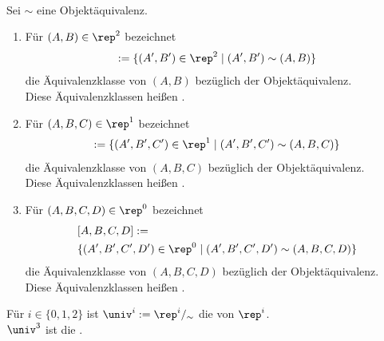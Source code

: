         \begin{dfn}\ \vspace{8pt}

            \noindent
            Sei $\sim$ eine Objektäquivalenz.
            \begin{enumerate}
                \item Für $(A,B) \in \rep^2$ bezeichnet 
                    \begin{align*}
                        [A,B] := \{(A',B') \in \rep^2 \mid (A',B') \sim (A,B)\}
                    \end{align*}
                    die Äquivalenzklasse von $(A,B)$ bezüglich der Objektäquivalenz.\\
                    Diese Äquivalenzklassen heißen .
                    
                \item Für $(A,B,C) \in \rep^1$ bezeichnet
                    \begin{align*}
                        [A,B,C] := \{(A',B',C') \in \rep^1 \mid (A',B',C') \sim (A,B,C)\}
                    \end{align*}			 
                    die Äquivalenzklasse von $(A,B,C)$ bezüglich der Objektäquivalenz.\\
                    Diese Äquivalenzklassen heißen .
                \item Für $(A,B,C,D) \in \rep^0$ bezeichnet
                    \begin{align*}
                        &[A,B,C,D] := \\
                        &\{(A',B',C',D') \in \rep^0 \mid (A',B',C',D') \sim (A,B,C,D)\}
                    \end{align*}			 
                    die Äquivalenzklasse von $(A,B,C,D)$ bezüglich der Objektäquivalenz.\\
                    Diese Äquivalenzklassen heißen .
            \end{enumerate}
            \noindent	
                Für $i \in \{0,1,2\}$ ist $\univ^i := \rep^i /_\sim$ die  von $\rep^i$.\\
                $\univ^3$ ist die .
                
        \end{dfn}
